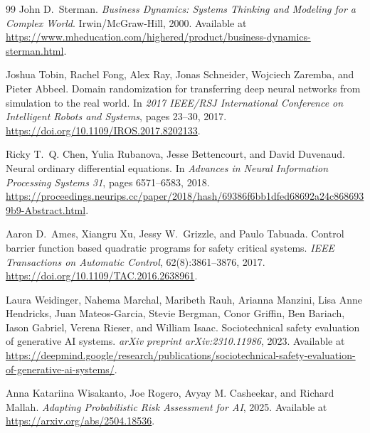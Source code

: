 \documentclass[11pt]{article}
\begin{document}
\begin{thebibliography}{99}
John D.~Sterman.
\textit{Business Dynamics: Systems Thinking and Modeling for a Complex World}.
Irwin/McGraw-Hill, 2000.
Available at \url{https://www.mheducation.com/highered/product/business-dynamics-sterman.html}.

Joshua Tobin, Rachel Fong, Alex Ray, Jonas Schneider, Wojciech Zaremba, and Pieter Abbeel.
Domain randomization for transferring deep neural networks from simulation to the real world.
In \textit{2017 IEEE/RSJ International Conference on Intelligent Robots and Systems}, pages 23--30, 2017.
\url{https://doi.org/10.1109/IROS.2017.8202133}.

Ricky T.~Q. Chen, Yulia Rubanova, Jesse Bettencourt, and David Duvenaud.
Neural ordinary differential equations.
In \textit{Advances in Neural Information Processing Systems 31}, pages 6571--6583, 2018.
\url{https://proceedings.neurips.cc/paper/2018/hash/69386f6bb1dfed68692a24c8686939b9-Abstract.html}.

Aaron D.~Ames, Xiangru Xu, Jessy W.~Grizzle, and Paulo Tabuada.
Control barrier function based quadratic programs for safety critical systems.
\textit{IEEE Transactions on Automatic Control}, 62(8):3861--3876, 2017.
\url{https://doi.org/10.1109/TAC.2016.2638961}.

Laura Weidinger, Nahema Marchal, Maribeth Rauh, Arianna Manzini, Lisa Anne Hendricks, Juan Mateos-Garcia, Stevie Bergman, Conor Griffin, Ben Bariach, Iason Gabriel, Verena Rieser, and William Isaac.
Sociotechnical safety evaluation of generative AI systems.
\textit{arXiv preprint arXiv:2310.11986}, 2023.
Available at \url{https://deepmind.google/research/publications/sociotechnical-safety-evaluation-of-generative-ai-systems/}.

Anna Katariina Wisakanto, Joe Rogero, Avyay M. Casheekar, and Richard Mallah.
\textit{Adapting Probabilistic Risk Assessment for AI}, 2025.
Available at \url{https://arxiv.org/abs/2504.18536}.


\end{thebibliography}
\end{document}

